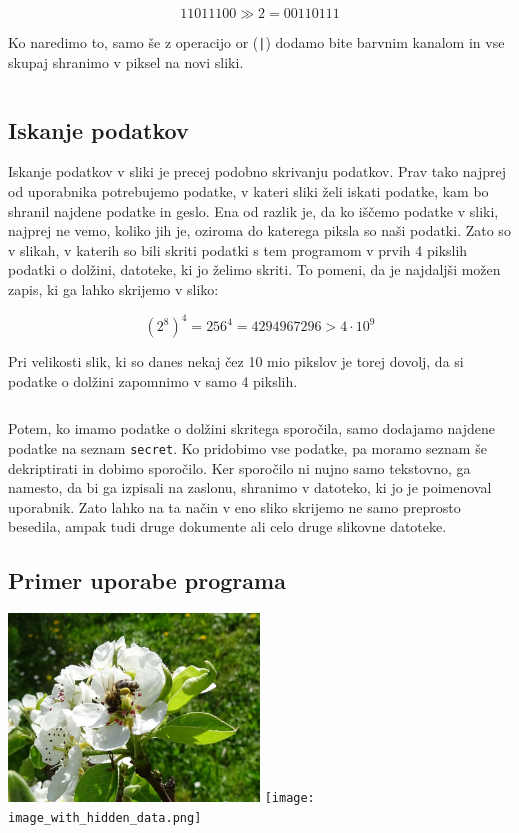     $$11011100 \gg 2 = 00110111$$

    Ko naredimo to, samo še z operacijo or (\texttt{|}) dodamo bite barvnim kanalom in vse skupaj shranimo v piksel na novi sliki.

    \inputminted[firstline=53, lastline=53, frame=lines]{python}{latex/code_parts.py}


\subsection{Iskanje podatkov}
    Iskanje podatkov v sliki je precej podobno skrivanju podatkov. Prav tako najprej od uporabnika potrebujemo podatke, v kateri sliki želi iskati podatke, kam bo shranil najdene podatke in geslo. Ena od razlik je, da ko iščemo podatke v sliki, najprej ne vemo, koliko jih je, oziroma do katerega piksla so naši podatki. Zato so v slikah, v katerih so bili skriti podatki s tem programom v prvih 4 pikslih podatki o dolžini, datoteke, ki jo želimo skriti. To pomeni, da je najdaljši možen zapis, ki ga lahko skrijemo v sliko:

    $$(2^8)^4 = 256^4 = 4294967296 > 4 \cdot 10^9$$

    Pri velikosti slik, ki so danes nekaj čez 10 mio pikslov je torej dovolj, da si podatke o dolžini zapomnimo v samo 4 pikslih.

    \inputminted[firstline=55, lastline=87, frame=lines]{python}{latex/code_parts.py}

    Potem, ko imamo podatke o dolžini skritega sporočila, samo dodajamo najdene podatke na seznam \texttt{secret}. Ko pridobimo vse podatke, pa moramo seznam še dekriptirati in dobimo sporočilo. Ker sporočilo ni nujno samo tekstovno, ga namesto, da bi ga izpisali na zaslonu, shranimo v datoteko, ki jo je poimenoval uporabnik. Zato lahko na ta način v eno sliko skrijemo ne samo preprosto besedila, ampak tudi druge dokumente ali celo druge slikovne datoteke.


\subsection{Primer uporabe programa}
    \includegraphics[width=0.5\textwidth]{image.png}
    \texttt{[image: image\_with\_hidden\_data.png]}

